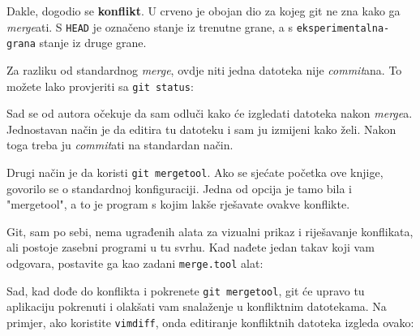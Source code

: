 
Dakle, dogodio se \textbf{konflikt}. 
U crveno je obojan dio za kojeg git ne zna kako ga \emph{merge}ati.
S \verb+HEAD+ je označeno stanje iz trenutne grane, a s \verb+eksperimentalna-grana+ stanje iz druge grane.

Za razliku od standardnog \emph{merge}, ovdje niti jedna datoteka nije \emph{commit}ana. 
To možete lako provjeriti sa \verb+git status+:



Sad se od autora očekuje da sam odluči kako će izgledati datoteka nakon \emph{merge}a.
Jednostavan način je da editira tu datoteku i sam ju izmijeni kako želi.
Nakon toga treba ju \emph{commit}ati na standardan način.

Drugi način je da koristi \verb+git mergetool+.
Ako se sjećate početka ove knjige, govorilo se o standardnoj konfiguraciji. 
Jedna od opcija je tamo bila i "mergetool", a to je program s kojim lakše rješavate ovakve konflikte.

Git, sam po sebi, nema ugrađenih alata za vizualni prikaz i riješavanje konflikata, ali postoje zasebni programi u tu svrhu. 
Kad nađete jedan takav koji vam odgovara, postavite ga kao zadani \verb+merge.tool+ alat:


Sad, kad dođe do konflikta i pokrenete \verb+git mergetool+, git će upravo tu aplikaciju pokrenuti i olakšati vam snalaženje u konfliktnim datotekama.
Na primjer, ako koristite \verb+vimdiff+, onda editiranje konfliktnih datoteka izgleda ovako:


